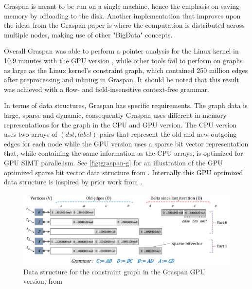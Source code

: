 Graspan is meant to be run on a single machine, hence the emphasis on saving memory by offloading to the disk. Another implementation that improves upon the ideas from the Graspan paper is \cite{gu2020towards} where the computation is distributed across multiple nodes, making use of other "BigData" concepts.

Overall Graspan was able to perform a pointer analysis for the Linux kernel in 10.9 minutes with the GPU version \cite{zuo2021systemizing}, while other tools fail to perform on graphs as large as the Linux kernel's constraint graph, which contained 250 million edges after preprocessing and inlining in Graspan. It should be noted that this result was achieved with a flow- and field-insensitive context-free grammar.

In terms of data structures, Graspan has specific requirements. The graph data is large, sparse and dynamic, consequently Graspan uses different in-memory representations for the graph in the CPU and GPU version. The CPU version uses two arrays of $(dst,label)$ pairs that represent the old and new outgoing edges for each node while the GPU version uses a sparse bit vector representation that, while containing the same information as the CPU arrays, is optimized for GPU SIMT parallelism. See \autoref{fig:graspan-g} for an illustration of the GPU optimized sparse bit vector data structure from \cite{zuo2021systemizing}. Internally this GPU optimized data structure is inspired by prior work from \cite{mendez2012gpu}.

\begin{figure}
    \centering
    \includegraphics[width=1.\textwidth]{img/graspan-g.png}
    \caption[Graspan GPU Data Structure for the Constraint Graph]{Data structure for the constraint graph in the Graspan GPU version, from \cite{zuo2021systemizing}}
    \label{fig:graspan-g}
\end{figure}

